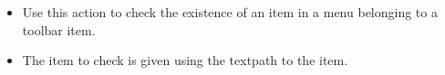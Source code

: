 
\begin{itemize}
\item Use this action to check the existence of an item in a menu belonging to a toolbar item.
\item The item to check is given using the textpath to the item.
\end{itemize}
